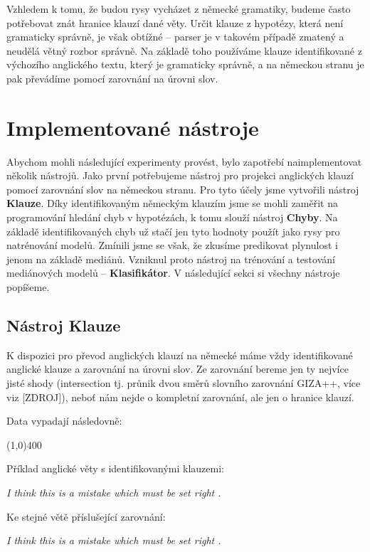 \documentclass[12pt,a4paper]{report}
\begin{document}
Vzhledem k tomu, že budou rysy vycházet z německé gramatiky, budeme často potřebovat znát hranice klauzí dané věty. Určit klauze z hypotézy, která není gramaticky správně, je však obtížné -- parser je v takovém případě zmatený a neudělá větný rozbor správně. Na základě toho používáme klauze identifikované z výchozího anglického textu, který je gramaticky správně, a na německou stranu je pak převádíme pomocí zarovnání na úrovni slov. 

\section{Implementované nástroje}
Abychom mohli následující experimenty provést, bylo zapotřebí naimplementovat několik nástrojů. Jako první potřebujeme nástroj pro projekci anglických klauzí pomocí zarovnání slov na německou stranu. Pro tyto účely jsme vytvořili nástroj \textbf{Klauze}. Díky identifikovaným německým klauzím jsme se mohli zaměřit na programování hledání chyb v hypotézách, k tomu slouží nástroj \textbf{Chyby}. Na základě identifikovaných chyb už stačí jen tyto hodnoty použít jako rysy pro natrénování modelů. Zmínili jsme se však, že zkusíme predikovat plynulost i jenom na základě mediánů. Vzniknul proto nástroj na trénování a testování mediánových modelů -- \textbf{Klasifikátor}. V následující sekci si všechny nástroje popíšeme.

\subsection{Nástroj Klauze}

K dispozici pro převod anglických klauzí na německé máme vždy identifikované anglické klauze a zarovnání na úrovni slov. Ze zarovnání bereme jen ty nejvíce jisté shody (intersection tj. průnik dvou směrů slovního zarovnání GIZA++, více viz [ZDROJ]), neboť nám nejde o kompletní zarovnání, ale jen o hranice klauzí.

Data vypadají následovně:

\line(1,0){400}

Příklad anglické věty s identifikovanými klauzemi:


\textit{\color{blue} I think this is a mistake which must be set right .\textbar}



Ke stejné větě příslušející zarovnání:

\textit{\color{blue} 
I think this is a mistake which must be set right .}
\end{document}

